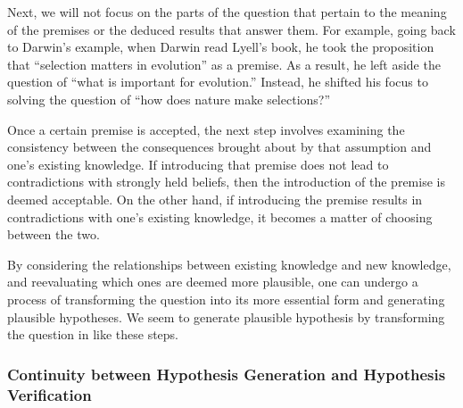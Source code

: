 \documentclass{book}
\begin{document}
Next, we will not focus on the parts of the question that pertain to the meaning of the premises or the deduced results that answer them. For example, going back to Darwin's example, when Darwin read Lyell's book, he took the proposition that ``selection matters in evolution'' as a premise. As a result, he left aside the question of ``what is important for evolution.'' Instead, he shifted his focus to solving the question of ``how does nature make selections?''

Once a certain premise is accepted, the next step involves examining the consistency between the consequences brought about by that assumption and one's existing knowledge. If introducing that premise does not lead to contradictions with strongly held beliefs, then the introduction of the premise is deemed acceptable. On the other hand, if introducing the premise results in contradictions with one's existing knowledge, it becomes a matter of choosing between the two. 



By considering the relationships between existing knowledge and new knowledge, and reevaluating which ones are deemed more plausible, one can undergo a process of transforming the question into its more essential form and generating plausible hypotheses. We seem to generate plausible hypothesis by transforming the question in like these steps.

\subsubsection{Continuity between Hypothesis Generation and Hypothesis Verification}
\end{document}
